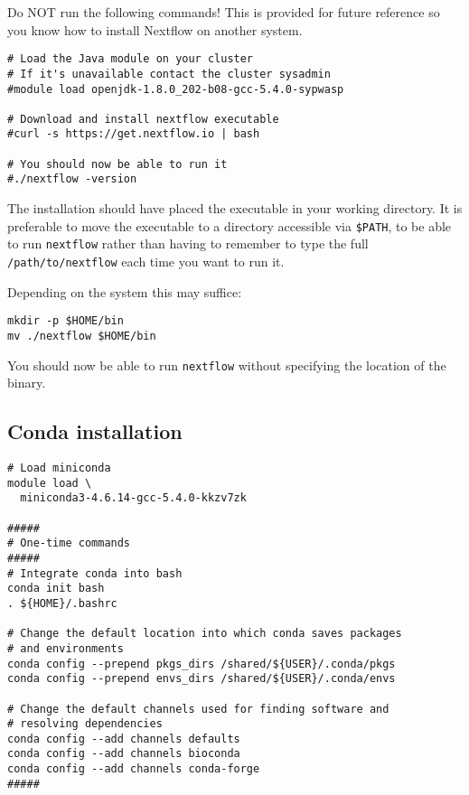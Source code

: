 \begin{warning}

Do NOT run the following commands! 
This is provided for future reference so you know how to install Nextflow on another system. 

\begin{lstlisting}
# Load the Java module on your cluster
# If it's unavailable contact the cluster sysadmin
#module load openjdk-1.8.0_202-b08-gcc-5.4.0-sypwasp 

# Download and install nextflow executable
#curl -s https://get.nextflow.io | bash

# You should now be able to run it
#./nextflow -version
\end{lstlisting}

The installation should have placed the executable in your working directory.
It is preferable to move the executable to a directory accessible via \texttt{\$PATH}, 
to be able to run \texttt{nextflow} rather than having to remember 
to type the full \texttt{/path/to/nextflow} each time you want to run it.

Depending on the system this may suffice:

\begin{lstlisting}
mkdir -p $HOME/bin
mv ./nextflow $HOME/bin
\end{lstlisting}

You should now be able to run \texttt{nextflow} without specifying the location of the binary.

\end{warning}


\subsection{Conda installation}

\begin{steps}
\begin{lstlisting}
# Load miniconda
module load \
  miniconda3-4.6.14-gcc-5.4.0-kkzv7zk

#####
# One-time commands
#####
# Integrate conda into bash
conda init bash
. ${HOME}/.bashrc

# Change the default location into which conda saves packages
# and environments
conda config --prepend pkgs_dirs /shared/${USER}/.conda/pkgs
conda config --prepend envs_dirs /shared/${USER}/.conda/envs

# Change the default channels used for finding software and
# resolving dependencies
conda config --add channels defaults
conda config --add channels bioconda
conda config --add channels conda-forge
#####
\end{lstlisting}
\end{steps}

